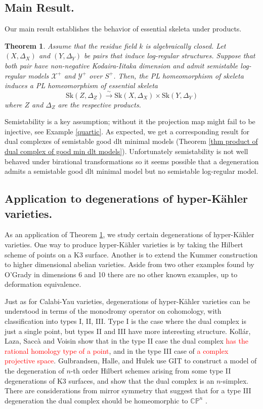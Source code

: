 \documentclass{amsart}%
\numberwithin{equation}{subsection}
\theoremstyle{plain2}
\newtheorem{theorem}[equation]{Theorem}
\theoremstyle{definition2}
\theoremstyle{stepstyle}
\theoremstyle{point}
\theoremstyle{subpoint}
\newcommand{\cX}{\ensuremath{\mathscr{X}}}
\newcommand{\cY}{\ensuremath{\mathscr{Y}}}
\renewcommand{\cY}{\ensuremath{\mathscr{Y}}}
\newcommand{\Sk}{\mathrm{Sk}}
\begin{document}
\subsection{Main Result.} Our main result establishes the behavior of essential skeleta under products.
\begin{theorem}\label{main thm intro}Assume that the residue field $k$ is algebraically closed. Let $(X,\Delta_X)$ and $(Y,\Delta_Y)$ be pairs that induce log-regular structures. Suppose that both pair have non-negative Kodaira-Iitaka dimension and admit semistable log-regular models $\cX^+$ and $\cY^+$ over $S^+$. Then, the PL homeomorphism of skeleta induces a PL homeomorphism of essential skeleta $$\Sk(Z,\Delta_Z) \xrightarrow{\sim} \Sk(X,\Delta_X) \times \Sk(Y,\Delta_Y)$$ where $Z$ and $\Delta_Z$ are the respective products. 
\end{theorem}
Semistability is a key assumption; without it the projection map might fail to be injective, see Example \ref{quartic}. As expected, we get a corresponding result for dual complexes of semistable good dlt minimal models (Theorem \ref{thm product of dual complex of good min dlt models}). Unfortunately semistability is not well behaved under birational transformations so it seems possible that a degeneration admits a semistable good dlt minimal model but no semistable log-regular model.

\subsection{Application to degenerations of hyper-K{\"a}hler varieties.}

As an application of Theorem \ref{main thm intro}, we study certain degenerations of hyper-K{\"a}hler varieties. One way to produce hyper-K{\"a}hler varieties is by taking the Hilbert scheme of points on a K3 surface. Another is to extend the Kummer construction to higher dimensional abelian varieties. Aside from two other examples found by O'Grady in dimensions 6 \cite{OGrady} and 10 \cite{OGradya} there are no other known examples, up to deformation equivalence.

Just as for Calabi-Yau varieties, degenerations of hyper-K{\"a}hler varieties can be understood in terms of the monodromy operator on cohomology, with classification into types I, II, III. Type I is the case where the dual complex is just a single point, but types II and III have more interesting structure. Koll{\'a}r, Laza, Sacc{\`a} and Voisin \cite{KollarLazaSaccaEtAl2017} show that in the type II case the dual complex \textcolor{red}{has the rational homology type of a point}, and in the type III case of \textcolor{red}{a complex projective space}. Gulbrandsen, Halle, and Hulek  \cite{GulbrandsenHalleHulek, GulbrandsenHalleHulek2016, GulbrandsenHalleHulekEtAl} use GIT to construct a model of the degeneration of $n$-th order Hilbert schemes arising from some type II degenerations of K3 surfaces, and show that the dual complex is an $n$-simplex. There are considerations from mirror symmetry that suggest that for a type III degeneration the dual complex should be homeomorphic to $\mathbb{C}\mathbb{P}^n$ \cite{Hwang, KontsevichSoibelman}.
\end{document}
